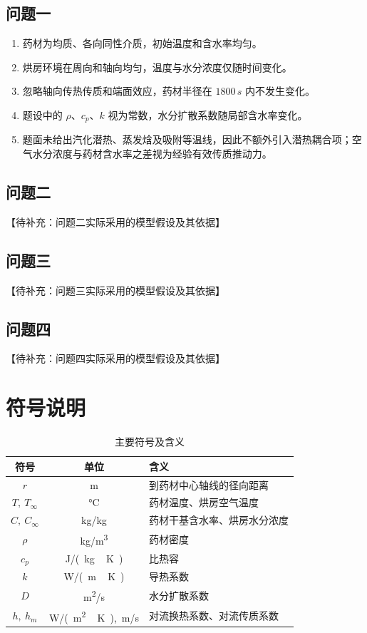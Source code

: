 \documentclass[withoutpreface,bwprint]{cumcmthesis}
\begin{document}
\subsection{问题一}

\begin{enumerate}
  \item 药材为均质、各向同性介质，初始温度和含水率均匀。
  \item 烘房环境在周向和轴向均匀，温度与水分浓度仅随时间变化。
  \item 忽略轴向传热传质和端面效应，药材半径在 $1800\,\si{s}$ 内不发生变化。
  \item 题设中的 $\rho$、$c_p$、$k$ 视为常数，水分扩散系数随局部含水率变化。
  \item 题面未给出汽化潜热、蒸发焓及吸附等温线，因此不额外引入潜热耦合项；空气水分浓度与药材含水率之差视为经验有效传质推动力。
\end{enumerate}

\subsection{问题二}

【待补充：问题二实际采用的模型假设及其依据】

\subsection{问题三}

【待补充：问题三实际采用的模型假设及其依据】

\subsection{问题四}

【待补充：问题四实际采用的模型假设及其依据】

\section{符号说明}

\begin{table}[H]
\centering
\caption{主要符号及含义}
\label{tab:symbols}
\begin{tabular}{ccl}
\toprule[1.2pt]
符号 & 单位 & 含义 \\
\midrule
$r$ & \si{m} & 到药材中心轴线的径向距离 \\
$T,\ T_\infty$ & \si{\celsius} & 药材温度、烘房空气温度 \\
$C,\ C_\infty$ & \si{kg/kg} & 药材干基含水率、烘房水分浓度 \\
$\rho$ & \si{kg/m^3} & 药材密度 \\
$c_p$ & \si{J/(kg\,K)} & 比热容 \\
$k$ & \si{W/(m\,K)} & 导热系数 \\
$D$ & \si{m^2/s} & 水分扩散系数 \\
$h,\ h_m$ & \si{W/(m^2\,K)},\ \si{m/s} & 对流换热系数、对流传质系数 \\
\bottomrule[1.2pt]
\end{tabular}
\end{table}
\end{document}
